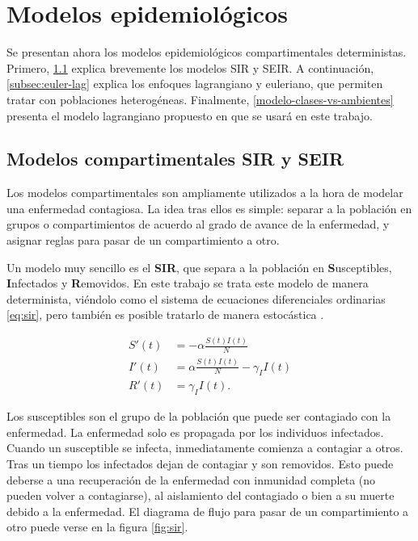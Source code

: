 

\section{Modelos epidemiológicos}\label{sec:epi-model}

Se presentan ahora los modelos epidemiológicos compartimentales deterministas. Primero, \ref{subsec:sir-seir} explica brevemente los modelos SIR y SEIR. A continuación, \ref{subsec:euler-lag} explica los enfoques lagrangiano y euleriano, que permiten tratar con poblaciones heterogéneas. Finalmente, \ref{modelo-clases-vs-ambientes} presenta el modelo lagrangiano propuesto en \cite{Bichara2018} que se usará en este trabajo.

\subsection{Modelos compartimentales SIR y SEIR}\label{subsec:sir-seir}

Los modelos compartimentales son ampliamente utilizados a la hora de modelar una enfermedad contagiosa. La idea tras ellos es simple: separar a la población en grupos o compartimientos de acuerdo al grado de avance de la enfermedad, y asignar reglas para pasar de un compartimiento a otro.

Un modelo muy sencillo es el \textbf{SIR}, que separa a la población en \textbf{S}usceptibles, \textbf{I}nfectados y \textbf{R}emovidos. En este trabajo se trata este modelo de manera determinista, viéndolo como el sistema de ecuaciones diferenciales ordinarias \ref{eq:sir}, pero también es posible tratarlo de manera estocástica \cite{Daley1984}.

\begin{equation}
\label{eq:sir}
\begin{aligned}
S'(t) &=  -\alpha \frac{S(t)I(t)}{N} \\
I'(t) &= \alpha \frac{S(t)I(t)}{N}- \gamma_I I(t) \\
R'(t) &= \gamma_I I(t).
\end{aligned}
\end{equation}

Los susceptibles son el grupo de la población que puede ser contagiado con la enfermedad. La enfermedad solo es propagada por los individuos infectados. Cuando un susceptible se infecta, inmediatamente comienza a contagiar a otros. Tras un tiempo los infectados dejan de contagiar y son removidos. Esto puede deberse a una recuperación de la enfermedad con inmunidad completa (no pueden volver a contagiarse), al aislamiento del contagiado o bien a su muerte debido a la enfermedad. El diagrama de flujo para pasar de un compartimiento a otro puede verse en la figura \ref{fig:sir}.

